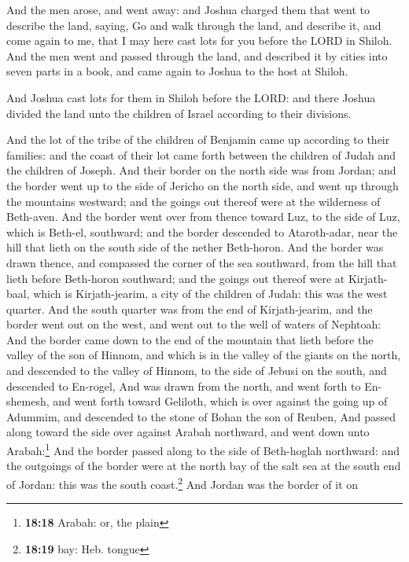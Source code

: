  And the men arose, and went away: and Joshua charged them
that went to describe the land, saying, Go and walk through the land,
and describe it, and come again to me, that I may here cast lots for you
before the LORD in Shiloh.  And the men went and passed
through the land, and described it by cities into seven parts in a book,
and came again to Joshua to the host at Shiloh.

 And Joshua cast lots for them in Shiloh before the LORD:
and there Joshua divided the land unto the children of Israel according
to their divisions.

 And the lot of the tribe of the children of Benjamin
came up according to their families: and the coast of their lot came
forth between the children of Judah and the children of Joseph.
 And their border on the north side was from Jordan; and
the border went up to the side of Jericho on the north side, and went up
through the mountains westward; and the goings out thereof were at the
wilderness of Beth-aven.  And the border went over from
thence toward Luz, to the side of Luz, which is Beth-el, southward; and
the border descended to Ataroth-adar, near the hill that lieth on the
south side of the nether Beth-horon.  And the border was
drawn thence, and compassed the corner of the sea southward, from the
hill that lieth before Beth-horon southward; and the goings out thereof
were at Kirjath-baal, which is Kirjath-jearim, a city of the children of
Judah: this was the west quarter.  And the south quarter
was from the end of Kirjath-jearim, and the border went out on the west,
and went out to the well of waters of Nephtoah:  And the
border came down to the end of the mountain that lieth before the valley
of the son of Hinnom, and which is in the valley of the giants on the
north, and descended to the valley of Hinnom, to the side of Jebusi on
the south, and descended to En-rogel,  And was drawn from
the north, and went forth to En-shemesh, and went forth toward Geliloth,
which is over against the going up of Adummim, and descended to the
stone of Bohan the son of Reuben,  And passed along
toward the side over against Arabah northward, and went down unto
Arabah:\footnote{\textbf{18:18} Arabah: or, the plain} 
And the border passed along to the side of Beth-hoglah northward: and
the outgoings of the border were at the north bay of the salt sea at the
south end of Jordan: this was the south coast.\footnote{\textbf{18:19}
  bay: Heb. tongue}  And Jordan was the border of it on

